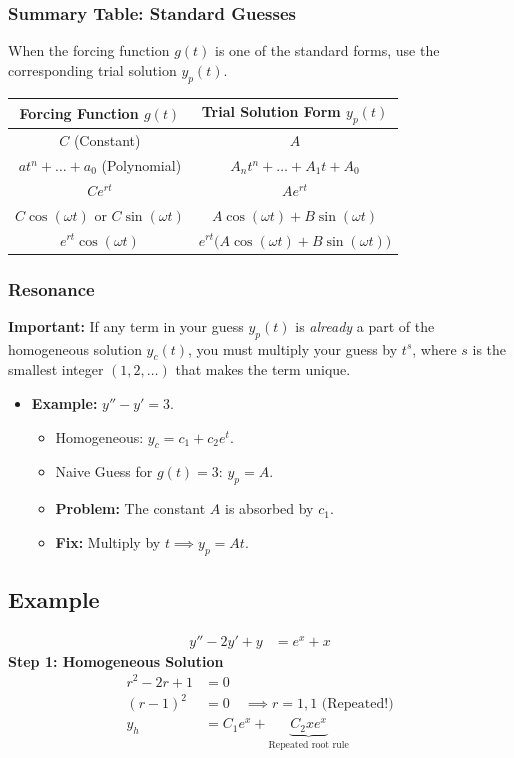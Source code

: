 \documentclass[11pt]{article}
\begin{document}
\subsubsection*{Summary Table: Standard Guesses}
When the forcing function $g(t)$ is one of the standard forms, use the corresponding trial solution $y_p(t)$.

\begin{center}
\renewcommand{\arraystretch}{1.5} %
\begin{tabular}{|c|c|}
\hline
\textbf{Forcing Function } $g(t)$ & \textbf{Trial Solution Form } $y_p(t)$ \\
\hline
$C$ (Constant) & $A$ \\
\hline
$at^n + \dots + a_0$ (Polynomial) & $A_n t^n + \dots + A_1 t + A_0$ \\
\hline
$C e^{rt}$ & $A e^{rt}$ \\
\hline
$C \cos(\omega t)$ or $C \sin(\omega t)$ & $A \cos(\omega t) + B \sin(\omega t)$ \\
\hline
$e^{rt} \cos(\omega t)$ & $e^{rt} \big( A \cos(\omega t) + B \sin(\omega t) \big)$ \\
\hline
\end{tabular}
\end{center}

\subsubsection*{Resonance}
\textbf{Important:} If any term in your guess $y_p(t)$ is \textit{already} a part of the homogeneous solution $y_c(t)$, you must multiply your guess by $t^s$, where $s$ is the smallest integer $(1, 2, \dots)$ that makes the term unique.

\begin{itemize}
    \item \textbf{Example:} $y'' - y' = 3$. 
    \begin{itemize}
        \item Homogeneous: $y_c = c_1 + c_2 e^t$.
        \item Naive Guess for $g(t)=3$: $y_p = A$.
        \item \textbf{Problem:} The constant $A$ is absorbed by $c_1$.
        \item \textbf{Fix:} Multiply by $t \implies \boxed{y_p = At}$.
    \end{itemize}
\end{itemize}
\subsection*{Example}
\begin{align*}
    y'' - 2y' + y &= e^x + x
\end{align*}
\textbf{Step 1: Homogeneous Solution}
\begin{align*}
    r^2 - 2r + 1 &= 0 \\
    (r-1)^2 &= 0 \quad \implies r = 1, 1 \text{ (Repeated!)} \\
    y_h &= C_1 e^x + \underbrace{C_2 x e^x}_{\text{Repeated root rule}}
\end{align*}
\end{document}
